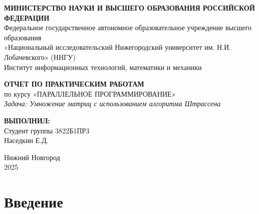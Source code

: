 \documentclass[14pt,a4paper]{extarticle}
\begin{document}
\begin{titlepage}
\begin{center}

\onehalfspacing

\begin{center}
    \textbf{МИНИСТЕРСТВО НАУКИ И ВЫСШЕГО ОБРАЗОВАНИЯ РОССИЙСКОЙ ФЕДЕРАЦИИ} \\
    Федеральное государственное автономное образовательное учреждение высшего образования \\
    «Национальный исследовательский Нижегородский университет им. Н.И. Лобачевского» (ННГУ) \\
    Институт информационных технологий, математики и механики
\end{center}

\vspace{4cm}

\begin{center}
    \textbf{ОТЧЕТ ПО ПРАКТИЧЕСКИМ РАБОТАМ} \vspace{0.5cm} \\
    по курсу «ПАРАЛЛЕЛЬНОЕ ПРОГРАММИРОВАНИЕ» \vspace{0.5cm} \\
    \textit{Задача: Умножение матриц с использованием алгоритма Штрассена}
\end{center}

\vspace{4cm}

\begin{flushright}
    \textbf{ВЫПОЛНИЛ:} \\ 
    Студент
    группы 3822Б1ПР3 \\ 
    Наседкин Е.Д. \\ 
\end{flushright}

\vspace{1cm}

\begin{center}
    Нижний Новгород \\
    2025 \newpage
\end{center}

\end{center}
\end{titlepage}

\tableofcontents
\newpage

\section{Введение}
\end{document}
